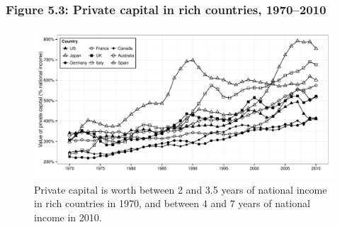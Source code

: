 \documentclass[t]{beamer}\usepackage[]{graphicx}\usepackage[]{color}
\newenvironment{knitrout}{}{} %
\begin{document}
\begin{frame}[label=Figure_5_3]
\frametitle{Figure 5.3: Private capital in rich countries, 1970--2010}
\begin{figure}[t]
\begin{minipage}[b]{\textwidth}
\centering
\begin{knitrout}\footnotesize
{}\color{fgcolor}

{\centering \includegraphics[width=1\linewidth]{figures/bw/Figure_5_3} 

}



\end{knitrout}
\caption{Private capital is worth between 2 and 3.5 years of national income in rich countries in 1970, and between 4 and 7 years of national income in 2010.}
\end{minipage}
\end{figure}
\end{frame}
\end{document}
